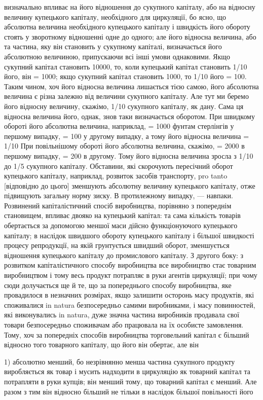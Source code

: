 \parcont{}  %
визначально впливає на його відношення до сукупного капіталу,
або на відносну величину купецького капіталу, необхідного для
циркуляції, бо ясно, що абсолютна величина необхідного купецького
капіталу і швидкість його обороту стоять у зворотному
відношенні одне до одного; але його відносна величина, або та
частина, яку він становить у сукупному капіталі, визначається
його абсолютною величиною, припускаючи всі інші умови
однаковими. Якщо сукупний капітал становить 10000, то, коли
купецький капітал становить 1/10 його, він = 1000; якщо сукупний
капітал становить 1000, то 1/10 його = 100. Таким чином, хоч
його відносна величина лишається тією самою, його абсолютна
величина є різна залежно від величини сукупного капіталу. Але
тут ми беремо його відносну величину, скажімо, 1/10 сукупного капіталу,
як дану. Сама ця відносна величина його, однак, знов таки
визначається оборотом. При швидкому обороті його абсолютна величина,
наприклад, = 1000 фунтам стерлінгів у першому випадку,
= 100 у другому випадку, а тому його відносна величина = 1/10
При повільнішому обороті його абсолютна величина, скажімо, =
2000 в першому випадку, = 200 в другому. Тому його відносна
величина зросла з 1/10 до 1/5 сукупного капіталу. Обставини,
які скорочують пересічний оборот купецького капіталу, наприклад,
розвиток засобів транспорту, pro tanto [відповідно до цього]
зменшують абсолютну величину купецького капіталу, отже
підвищують загальну норму зиску. В протилежному випадку, —
навпаки. Розвинений капіталістичний спосіб виробництва, порівняно
з попереднім становищем, впливає двояко на купецький
капітал: та сама кількість товарів обертається за допомогою
меншої маси дійсно функціонуючого купецького капіталу; в наслідок
швидшого обороту купецького капіталу і більшої швидкості
процесу репродукції, на якій грунтується швидший оборот,
зменшується відношення купецького капіталу до промислового
капіталу. З другого боку: з розвитком капіталістичного способу
виробництва все виробництво стає товарним виробництвом і тому
весь продукт потрапляє в руки агентів циркуляції; при чому
сюди долучається ще й те, що за попереднього способу виробництва,
яке провадилося в незначних розмірах, якщо залишити
осторонь масу продуктів, які споживалися in natura безпосередньо
самими виробниками, і масу повинностей, які виконувались
in natura, дуже значна частина виробників продавала свої
товари безпосередньо споживачам або працювала на їх особисте
замовлення. Тому, хоч за попередніх способів виробництва торговельний
капітал є більший відносно того товарного капіталу,
що його він обертає, але він

1) абсолютно менший, бо незрівнянно менша частина сукупного
продукту виробляється як товар і мусить надходити в циркуляцію
як товарний капітал та потрапляти в руки купців; він менший
тому, що товарний капітал є менший. Але разом з тим він відносно
більший не тільки в наслідок більшої повільності його
\parbreak{}  %
